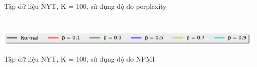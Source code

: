 \documentclass[pdf]{beamer}
\begin{document}
\begin{frame}{Tập dữ liệu NYT, K = 100, sử dụng độ đo perplexity }
\begin{columns}[T]
\begin{column}{.50\textwidth}
\begin{figure}
		\end{figure}				
	\end{column} %
\end{columns}
\begin{center}
	\includegraphics[width=1\textwidth]{menu.png}	
\end{center}
\end{frame}


\begin{frame}{Tập dữ liệu NYT, K = 100, sử dụng độ đo NPMI }
\begin{columns}[T] %
\begin{column}{.50\textwidth}
	\begin{figure}
	\end{figure}
\end{column} %
\hfill%
\begin{column}{.50\textwidth}
	\begin{figure}

\end{figure}
\end{column}
\end{columns}
\end{frame}
\end{document}
